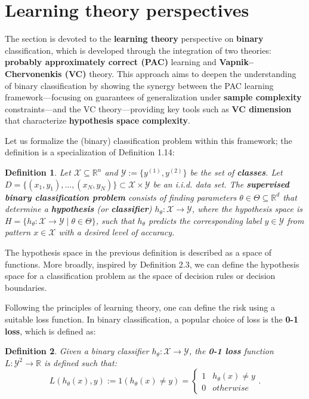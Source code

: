 \documentclass{report}
\newtheorem{definition}{Definition}[chapter]
\begin{document}
\section{Learning theory perspectives}
The section is devoted to the \textbf{learning theory} perspective on \textbf{binary} classification, which is developed through the integration of two theories: \textbf{probably approximately correct (PAC)} learning and \textbf{Vapnik–Chervonenkis (VC)} theory. This approach aims to deepen the understanding of binary classification by showing the synergy between the PAC learning framework—focusing on guarantees of generalization under \textbf{sample complexity} constraints—and the VC theory—providing key tools such as \textbf{VC dimension} that characterize \textbf{hypothesis space complexity}.

Let us formalize the (binary) classification problem within this framework; the definition is a specialization of Definition 1.14:

\begin{definition}
Let $\mathcal{X} \subseteq \mathbb{R}^n$ and $\mathcal{Y} := \{y^{(1)}, y^{(2)}\}$ be the set of \textbf{classes}. Let $D = \{(x_1,y_1), \dots, (x_N,y_N)\} \subset \mathcal{X} \times \mathcal{Y}$ be an i.i.d. data set. The \textbf{supervised binary classification problem} consists of finding parameters $\theta \in \Theta \subseteq \mathbb{R}^d$ that determine a \textbf{hypothesis} (or \textbf{classifier}) $h_\theta : \mathcal{X} \to \mathcal{Y}$, where the hypothesis space is $H = \{h_\theta : \mathcal{X} \to \mathcal{Y} \mid \theta \in \Theta\}$, such that $h_\theta$ predicts the corresponding label $y \in \mathcal{Y}$ from pattern $x \in \mathcal{X}$ with a desired level of accuracy.
\end{definition}

The hypothesis space in the previous definition is described as a space of functions. More broadly, inspired by Definition 2.3, we can define the hypothesis space for a classification problem as the space of decision rules or decision boundaries.

Following the principles of learning theory, one can define the risk using a suitable loss function. In binary classification, a popular choice of loss is the \textbf{0-1 loss}, which is defined as:

\begin{definition}
Given a binary classifier $h_\theta : \mathcal{X} \to \mathcal{Y}$, the \textbf{0-1 loss} function $L : \mathcal{Y} ^ 2 \to \mathbb{R}$ is defined such that:
\begin{equation}
L(h_\theta(x), y) := 1(h_\theta(x) \neq y) = \left\{\begin{matrix}
1 &  h_\theta(x) \neq y \\
0 & otherwise
\end{matrix}\right..
\end{equation}
\end{definition}
\end{document}
